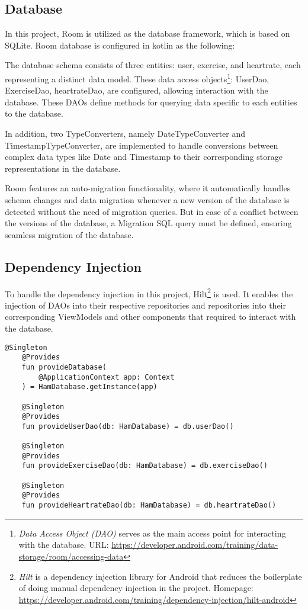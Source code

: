 \subsection{Database}
In this project, Room is utilized as the database framework, which is based on SQLite. Room database is configured in kotlin as the following:

The database schema consists of three entities: user, exercise, and heartrate, each representing a distinct data model.
These data access objects\footnote{\emph{Data Access Object (DAO)} serves as the main access point for interacting with the database. URL: \url{https://developer.android.com/training/data-storage/room/accessing-data}}: UserDao, ExerciseDao, heartrateDao, are configured, allowing interaction with the database. These DAOs define methods for querying data specific to each entities to the database.

In addition, two TypeConverters, namely DateTypeConverter and TimestampTypeConverter, are implemented to handle conversions between complex data types like Date and Timestamp to their corresponding storage representations in the database.

Room features an auto-migration functionality, where it automatically handles schema changes and data migration whenever a new version of the database is detected without the need of migration queries.
But in case of a conflict between the versions of the database, a Migration SQL query must be defined, ensuring seamless migration of the database.

\subsection{Dependency Injection}
To handle the dependency injection in this project, Hilt\footnote{\emph{Hilt} is a dependency injection library for Android that reduces the boilerplate of doing manual dependency injection in the project. Homepage: \url{https://developer.android.com/training/dependency-injection/hilt-android}} is used. 
It enables the injection of DAOs into their respective repositories and repositories into their corresponding ViewModels and other components that required to interact with the database. 
\begin{lstlisting}[caption={Dependency injection configuration (AppModule)}]
    @Singleton
    @Provides
    fun provideDatabase(
        @ApplicationContext app: Context
    ) = HamDatabase.getInstance(app)

    @Singleton
    @Provides
    fun provideUserDao(db: HamDatabase) = db.userDao()

    @Singleton
    @Provides
    fun provideExerciseDao(db: HamDatabase) = db.exerciseDao()

    @Singleton
    @Provides
    fun provideHeartrateDao(db: HamDatabase) = db.heartrateDao()
\end{lstlisting}
